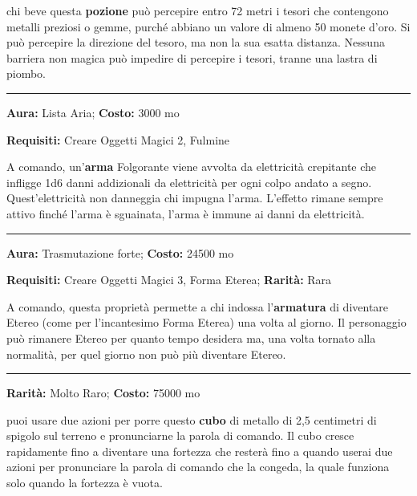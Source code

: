 \begin{multicols}{2}
chi beve questa \textbf{pozione} può percepire entro 72 metri i tesori che contengono metalli preziosi o gemme, purché abbiano un valore di almeno 50 monete d'oro. Si può percepire la direzione del tesoro, ma non la sua esatta distanza. Nessuna barriera non magica può impedire di percepire i tesori, tranne una lastra di piombo.

\smallskip\noindent\rule{\linewidth}{2pt}  \hypertarget{Folgorante}{}\medskip{}\noindent\label{Folgorante}

\textbf{Aura:} Lista Aria; \textbf{Costo:} 3000 mo

\textbf{Requisiti:} Creare Oggetti Magici 2, Fulmine

A comando, un'\textbf{arma} Folgorante viene avvolta da elettricità crepitante che infligge 1d6 danni addizionali da elettricità per ogni colpo andato a segno. Quest'elettricità non danneggia chi impugna l'arma. L'effetto rimane sempre attivo finché l'arma è sguainata, l'arma è immune ai danni da elettricità.

\smallskip\noindent\rule{\linewidth}{2pt}  \hypertarget{FormaEterea}{}\medskip{}\noindent\label{FormaEterea}

\textbf{Aura:} Trasmutazione forte; \textbf{Costo:} 24500 mo

\textbf{Requisiti:} Creare Oggetti Magici 3, Forma Eterea; \textbf{Rarità:} Rara

A comando, questa proprietà permette a chi indossa l'\textbf{armatura} di diventare Etereo (come per l'incantesimo Forma Eterea) una volta al giorno. Il personaggio può rimanere Etereo per quanto tempo desidera ma, una volta tornato alla normalità, per quel giorno non può più diventare Etereo.

\smallskip\noindent\rule{\linewidth}{2pt}  \hypertarget{FortezzaIstantanea}{}\medskip{}\noindent\label{FortezzaIstantanea}

\textbf{Rarità:} Molto Raro; \textbf{Costo:} 75000 mo

puoi usare due azioni per porre questo \textbf{cubo} di metallo di 2,5 centimetri di spigolo sul terreno e pronunciarne la parola di comando. Il cubo cresce rapidamente fino a diventare una fortezza che resterà fino a quando userai due azioni per pronunciare la parola di comando che la congeda, la quale funziona solo quando la fortezza è vuota.


\end{multicols}
